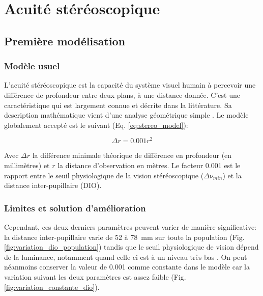 	\section{Acuité stéréoscopique}
	\subsection{Première modélisation}	
	\subsubsection{Modèle usuel}	
	\par L'acuité stéréoscopique est la capacité du système visuel humain à percevoir une différence de profondeur entre deux plans, à une distance donnée. C'est une caractéristique qui est largement connue et décrite dans la littérature. Sa description mathématique vient d'une analyse géométrique simple \citep{fuchs_traite_2003,gross_human_2008}. Le modèle globalement accepté est le suivant (Eq. \ref{eq:stereo_model}):

	\begin{equation}	
		\Delta r = 0.001 r^2
		\label{eq:stereo_model}
	\end{equation}
	 
	\par Avec $\Delta r$ la différence minimale théorique de différence en profondeur (en millimètres) et $r$ la distance d'observation en mètres. Le facteur 0.001 est le rapport entre le seuil physiologique de la vision stéréoscopique ($\Delta \nu_{min}$) et la distance inter-pupillaire (DIO).
	
	\subsubsection{Limites et solution d'amélioration}
	\par Cependant, ces deux derniers paramètres peuvent varier de manière significative: la distance inter-pupillaire varie de 52 à 78~mm sur toute la population \citep{dodgson_variation_2004} (Fig. \ref{fig:variation_dio_population}) tandis que le seuil physiologique de vision dépend de la luminance, notamment quand celle ci est à un niveau très bas \citep{gross_human_2008}. On peut néanmoins conserver la valeur de 0.001 comme constante dans le modèle car la variation suivant les deux paramètres est assez faible (Fig. \ref{fig:variation_constante_dio}).
	

